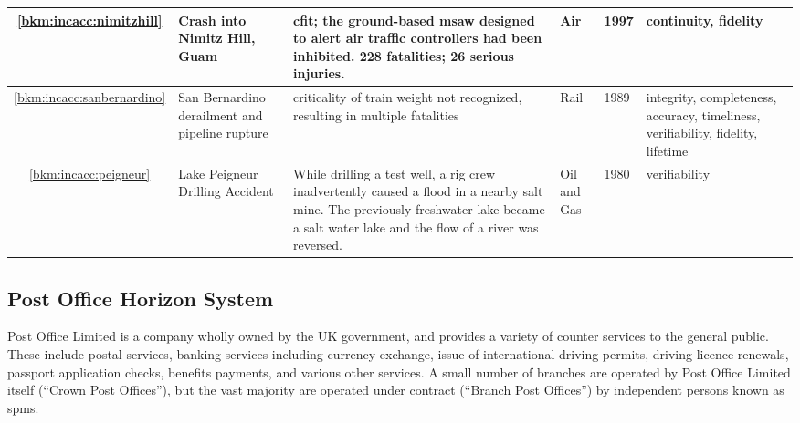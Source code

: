 \begin{longtable}{|C{}|L{}|L{}|L{}|L{}|L{}|}
	\hline
	\ref{bkm:incacc:nimitzhill} & Crash into Nimitz Hill, Guam & \Gls{cfit}; the ground-based \gls{msaw} designed to alert air traffic controllers had been inhibited. 228 fatalities; 26 serious injuries. & Air & 1997 & \Gls{continuity}, \gls{fidelity}\\
	\hline
        \ref{bkm:incacc:sanbernardino} &
        San Bernardino  derailment and pipeline rupture & \Gls{criticality} of train weight not recognized,
        resulting in multiple fatalities &
        Rail & 1989 & \Gls{integrity}, \gls{completeness}, \gls{accuracy}, \gls{timeliness}, \gls{verifiability}, \gls{fidelity}, \gls{lifetime} \\
        \hline
	\ref{bkm:incacc:peigneur} & Lake Peigneur Drilling Accident & While drilling a test well, a rig crew inadvertently caused a flood in a nearby salt mine. The previously freshwater lake became a salt water lake and the flow of a river was reversed. & Oil and Gas & 1980 & \Gls{verifiability} \\
	\hline

\end{longtable}

\subsection{Post Office Horizon System}\label{bkm:incacc:horizon}
Post Office Limited is a company wholly owned by the UK government, and provides a variety of counter services to the general public. These include postal services, banking services including currency exchange, issue of international driving permits, driving licence renewals, passport application checks, benefits payments, and various other services. A small number of branches are operated by Post Office Limited itself (``Crown Post Offices''), but the vast majority are operated under contract (``Branch Post Offices'') by independent persons known as \glspl{spm}.

